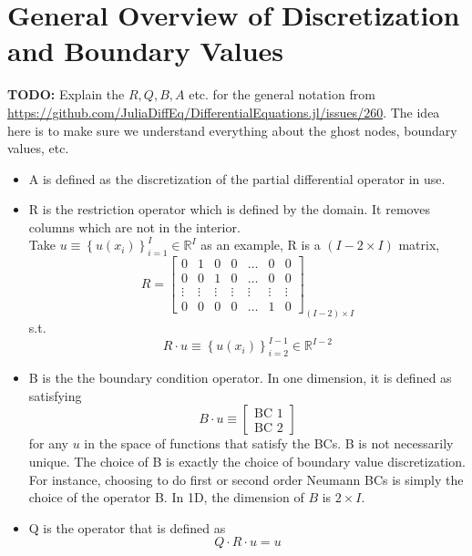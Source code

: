 \documentclass[11pt]{article}
\newcommand{\set}[1]{\ensuremath{\left\{{#1}\right\}}}
\newcommand{\R}{\ensuremath{\mathbb{R}}}
\begin{document}
\section{General Overview of Discretization and Boundary Values}\label{sec:general}
\textbf{TODO:} Explain the $R, Q, B, A$ etc. for the general notation from \url{https://github.com/JuliaDiffEq/DifferentialEquations.jl/issues/260}.  The idea here is to make sure we understand everything about the ghost nodes, boundary values, etc.
\begin{itemize}
\item A is defined as the discretization of the partial differential operator in use.
\item R is the restriction operator which is defined by the domain. It removes columns which are not in the interior.\\
Take $u \equiv \set{u(x_i)}_{i=1}^I \in \R^I$ as an example, R is a $(I-2\times I)$ matrix,
\begin{equation}
R = \begin{bmatrix}
0&1&0&0&\dots &0&0\\
0&0&1&0&\dots &0&0\\
\vdots&\vdots&\vdots&\vdots&\vdots&\vdots&\vdots\\
0&0&0&0&\dots&1&0
\end{bmatrix}_{(I-2)\times I}
\end{equation}
s.t. 
\begin{equation}
R\cdot u  \equiv\set{u(x_i)}_{i=2}^{I-1} \in \R^{I-2} \label{R_operator}
\end{equation}
\item B is the the boundary condition operator. In one dimension, it is defined as satisfying
\begin{equation}
B\cdot u \equiv \begin{bmatrix}
\text{BC 1}\\
\text{BC 2}
\end{bmatrix}\label{B_operator}
\end{equation}
for any $u$ in the space of functions that satisfy the BCs. B is not necessarily unique. The choice of B is exactly the choice of boundary value discretization. For instance, choosing to do first or second order Neumann BCs is simply the choice of the operator B. In 1D, the dimension of $B$ is $2\times I$.
\item Q is the operator that is defined as
\begin{equation}
Q \cdot R\cdot u = u\label{Q_operator_1}
\end{equation}

\end{itemize}
\end{document}
